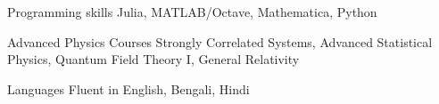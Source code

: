

\begin{cvskills}


  

  \cvskill
    {Programming skills} %
    {Julia, MATLAB/Octave, Mathematica, Python} %

  \cvskill
{Advanced Physics Courses} %
{Strongly Correlated Systems, Advanced Statistical Physics, Quantum Field Theory I, General Relativity} %

  \cvskill
    {Languages} %
    {Fluent in English, Bengali, Hindi} %

\end{cvskills}
